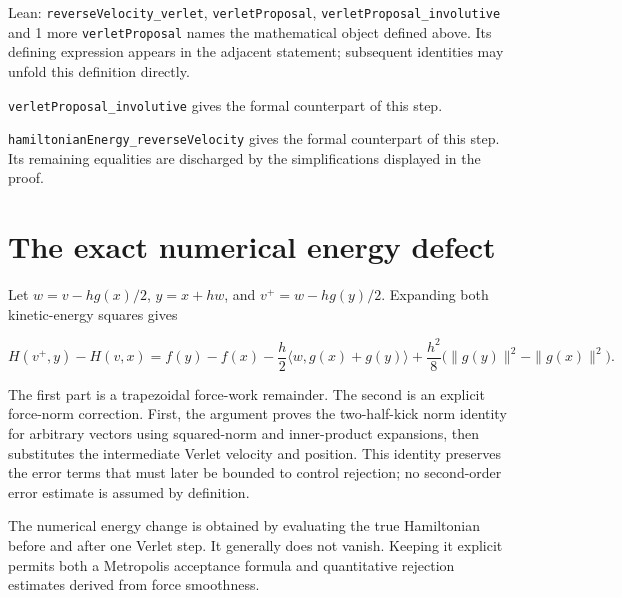 \documentclass[11pt,a4paper]{article}
\begin{document}
\begin{leanbox}{Lean: \texttt{reverseVelocity\_\allowbreak{}verlet}, \texttt{verletProposal}, \texttt{verletProposal\_\allowbreak{}involutive} and 1 more}
\texttt{verlet\allowbreak{}Proposal} names the mathematical object defined above. Its defining expression appears in the adjacent statement; subsequent identities may unfold this definition directly.




\texttt{verlet\allowbreak{}Proposal\_\allowbreak{}involutive} gives the formal counterpart of this step.




\texttt{hamiltonian\allowbreak{}Energy\_\allowbreak{}reverse\allowbreak{}Velocity} gives the formal counterpart of this step. Its remaining equalities are discharged by the simplifications displayed in the proof.
\end{leanbox}

\section{\texorpdfstring{The exact numerical energy defect}{The exact numerical energy defect}}


Let \(w=v-hg(x)/2\), \(y=x+hw\), and \(v^+=w-hg(y)/2\). Expanding both kinetic-energy squares gives

\[H(v^+,y)-H(v,x)=f(y)-f(x)-\frac h2\langle w,g(x)+g(y)\rangle
+\frac{h^2}{8}\bigl(\|g(y)\|^2-\|g(x)\|^2\bigr).\]

The first part is a trapezoidal force-work remainder. The second is an explicit force-norm correction. First, the argument proves the two-half-kick norm identity for arbitrary vectors using squared-norm and inner-product expansions, then substitutes the intermediate Verlet velocity and position. This identity preserves the error terms that must later be bounded to control rejection; no second-order error estimate is assumed by definition.



The numerical energy change is obtained by evaluating the true Hamiltonian before and after one Verlet step. It generally does not vanish. Keeping it explicit permits both a Metropolis acceptance formula and quantitative rejection estimates derived from force smoothness.
\end{document}
